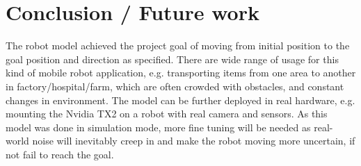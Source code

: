 \documentclass[10pt,journal,compsoc]{IEEEtran}
\begin{document}
\section{Conclusion / Future work}

The robot model achieved the project goal of moving from initial position to the goal position and direction as specified.  There are wide range of usage for this kind of mobile robot application, e.g. transporting items from one area to another in factory/hospital/farm, which are often crowded with obstacles, and constant changes in environment.  The model can be further deployed in real hardware, e.g. mounting the Nvidia TX2 on a robot with real camera and sensors.  As this model was done in simulation mode, more fine tuning will be needed as real-world noise will inevitably creep in and make the robot moving more uncertain, if not fail to reach the goal.







\end{document}
